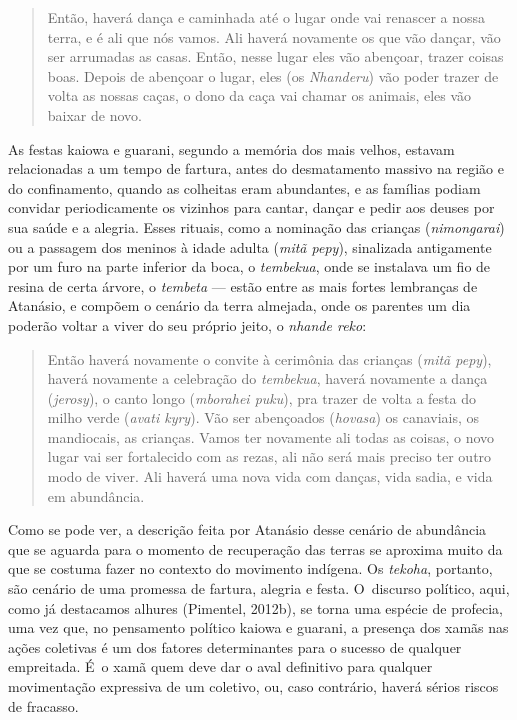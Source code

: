 \begin{quote}
\noindent
Então, haverá dança e caminhada até o lugar onde vai renascer a nossa
terra, e é ali que nós vamos. Ali haverá novamente os que vão dançar,
vão ser arrumadas as casas. Então, nesse lugar eles vão abençoar,
trazer coisas boas. Depois de abençoar o lugar, eles (os \emph{Nhanderu}) vão
poder trazer de volta as nossas caças, o dono da caça vai chamar os
animais, eles vão baixar de novo.
\end{quote}

As festas kaiowa e guarani, segundo a memória dos mais velhos, estavam
relacionadas a um tempo de fartura, antes do desmatamento massivo na
região e do confinamento, quando as colheitas eram abundantes, e as
famílias podiam convidar periodicamente os vizinhos para cantar, dançar
e pedir aos deuses por sua saúde e a alegria. Esses rituais, como a
nominação das crianças (\emph{nimongarai}) ou a passagem dos meninos à idade
adulta (\emph{mitã pepy}), sinalizada antigamente por um furo na parte
inferior da boca, o \emph{tembekua}, onde se instalava um fio de resina de
certa árvore, o \emph{tembeta} --- estão entre as mais fortes lembranças de
Atanásio, e compõem o cenário da terra almejada, onde os parentes um
dia poderão voltar a viver do seu próprio jeito, o \emph{nhande reko}:

\begin{quote}
\noindent
Então haverá novamente o convite à cerimônia das crianças (\emph{mitã pepy}),
haverá novamente a celebração do \emph{tembekua}, haverá novamente a dança
(\emph{jerosy}), o canto longo (\emph{mborahei puku}), pra trazer de volta a festa do
milho verde (\emph{avati kyry}). Vão ser abençoados (\emph{hovasa}) os canaviais, os
mandiocais, as crianças. Vamos ter novamente ali todas as coisas, o
novo lugar vai ser fortalecido com as rezas, ali não será mais preciso
ter outro modo de viver. Ali haverá uma nova vida com danças, vida
sadia, e vida em abundância.
\end{quote}

Como se pode ver, a descrição feita por Atanásio desse cenário de
abundância que se aguarda para o momento de recuperação das terras se
aproxima muito da que se costuma fazer no contexto do movimento
indígena. Os \emph{tekoha}, portanto, são cenário de uma promessa de fartura,
alegria e festa. O~discurso político, aqui, como já destacamos alhures
(Pimentel, 2012b), se torna uma espécie de profecia, uma vez que, no
pensamento político kaiowa e guarani, a presença dos xamãs nas ações
coletivas é um dos fatores determinantes para o sucesso de qualquer
empreitada. É~o xamã quem deve dar o aval definitivo para qualquer
movimentação expressiva de um coletivo, ou, caso contrário, haverá
sérios riscos de fracasso. 

